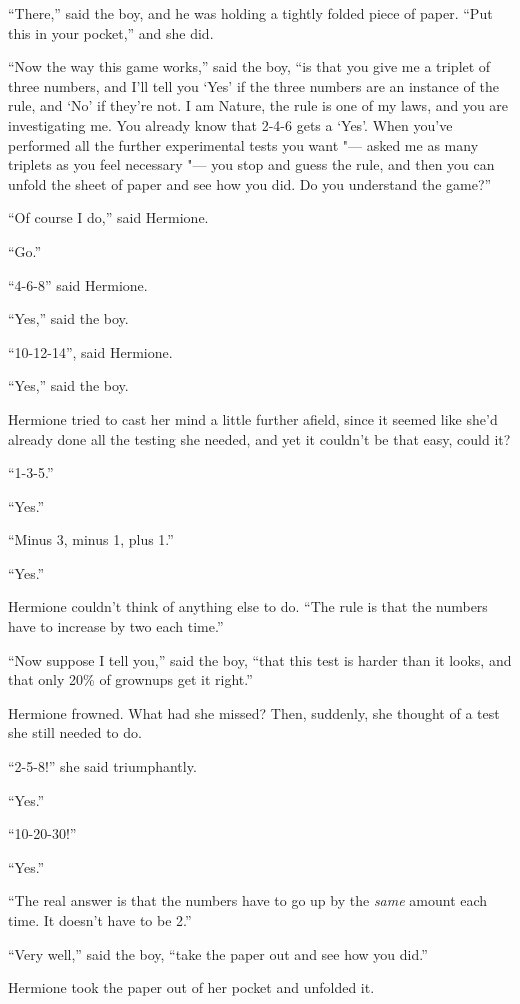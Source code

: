 ``There,'' said the boy, and he was holding a tightly folded piece of
paper. ``Put this in your pocket,'' and she did.

``Now the way this game works,'' said the boy, ``is that you give me a
triplet of three numbers, and I'll tell you `Yes' if the three numbers
are an instance of the rule, and `No' if they're not. I am Nature, the
rule is one of my laws, and you are investigating me. You already know
that 2-4-6 gets a `Yes'. When you've performed all the further
experimental tests you want "--- asked me as many triplets as you feel
necessary "--- you stop and guess the rule, and then you can unfold the
sheet of paper and see how you did. Do you understand the game?''

``Of course I do,'' said Hermione.

``Go.''

``4-6-8'' said Hermione.

``Yes,'' said the boy.

``10-12-14'', said Hermione.

``Yes,'' said the boy.

Hermione tried to cast her mind a little further afield, since it seemed
like she'd already done all the testing she needed, and yet it couldn't
be that easy, could it?

``1-3-5.''

``Yes.''

``Minus 3, minus 1, plus 1.''

``Yes.''

Hermione couldn't think of anything else to do. ``The rule is that the
numbers have to increase by two each time.''

``Now suppose I tell you,'' said the boy, ``that this test is harder
than it looks, and that only 20\% of grownups get it right.''

Hermione frowned. What had she missed? Then, suddenly, she thought of a
test she still needed to do.

``2-5-8!'' she said triumphantly.

``Yes.''

``10-20-30!''

``Yes.''

``The real answer is that the numbers have to go up by the \emph{same}
amount each time. It doesn't have to be 2.''

``Very well,'' said the boy, ``take the paper out and see how you did.''

Hermione took the paper out of her pocket and unfolded it.

